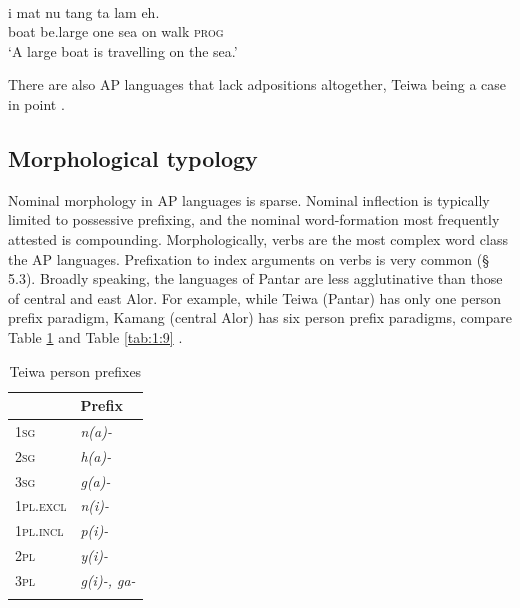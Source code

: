 \ea%
\label{ex:1:32}
\\
\gll 
{\textepsilon}i  mat{\textepsilon}  nu  tang  ta  lam{\textepsilon} eh.  \\
 boat  be.large  one  sea  on  walk  \textsc{prog}   \\
\glt `A large boat is travelling on the sea.'
\z

 
There are also AP languages that lack adpositions altogether, Teiwa being a case in point \citep{Klamer2010grammar}. 

\subsection{Morphological typology} \label{sec:1:5.7}
Nominal morphology in AP languages is sparse. Nominal inflection is typically limited to possessive prefixing, and the nominal word-formation most frequently attested is compounding. Morphologically, verbs are the most complex word class the AP languages. Prefixation to index arguments on verbs is very common ({\S} 5.3). Broadly speaking, the languages of Pantar are less agglutinative than those of central and east Alor. For example, while Teiwa (Pantar) has only one person prefix paradigm, Kamang (central Alor) has six person prefix paradigms, compare Table \ref{tab:1:8} and Table \ref{tab:1:9} \citep{FeddenEtAlTV}. 
 

\begin{table}\centering


\begin{tabular}{ll} 
\mytoprule
& Prefix\\
\midrule
{\scshape 1sg} & {\itshape n(a)-}\\
{\scshape 2sg} & {\itshape h(a)-}\\
{\scshape 3sg} & {\itshape g(a)-}\\
{\scshape 1pl.excl} & {\itshape n(i)-}\\
{\scshape 1pl.incl} & {\itshape p(i)-}\\
{\scshape 2pl} & {\itshape y(i)-}\\
{\scshape 3pl} & {\itshape g(i)-, ga-}\\
\mybottomrule
\end{tabular}

\caption{Teiwa person prefixes \citep[77,78]{Klamer2010grammar}}
\label{tab:1:8}
\end{table}

 

